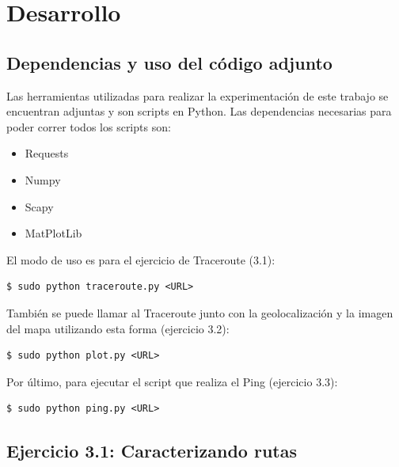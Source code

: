 \section{Desarrollo}

\subsection{Dependencias y uso del código adjunto}

Las herramientas utilizadas para realizar la experimentación de este trabajo se encuentran adjuntas y son scripts en Python. Las dependencias necesarias para poder correr todos los scripts son:

\begin{itemize}
  \item Requests
  \item Numpy
  \item Scapy
  \item MatPlotLib
\end{itemize}

El modo de uso es para el ejercicio de Traceroute (3.1):

\begin{verbatim}
$ sudo python traceroute.py <URL>
\end{verbatim}

También se puede llamar al Traceroute junto con la geolocalización y la imagen del mapa utilizando esta forma (ejercicio 3.2):

\begin{verbatim}
$ sudo python plot.py <URL>
\end{verbatim}

Por último, para ejecutar el script que realiza el Ping (ejercicio 3.3):

\begin{verbatim}
$ sudo python ping.py <URL>
\end{verbatim}

\subsection{Ejercicio 3.1: Caracterizando rutas}


